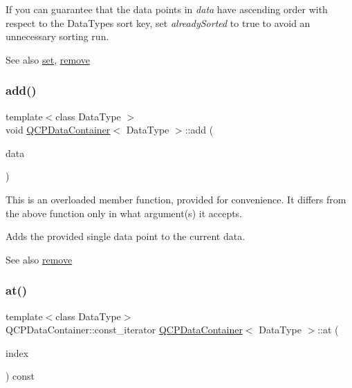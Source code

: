 If you can guarantee that the data points in {\itshape data} have ascending order with respect to the Data\+Type\textquotesingle{}s sort key, set {\itshape already\+Sorted} to true to avoid an unnecessary sorting run.

\begin{DoxySeeAlso}{See also}
\mbox{\hyperlink{class_q_c_p_data_container_ae7042bd534fc3ce7befa2ce3f790b5bf}{set}}, \mbox{\hyperlink{class_q_c_p_data_container_ae5f569a120648b167efa78835f12fd38}{remove}} 
\end{DoxySeeAlso}
\mbox{\label{class_q_c_p_data_container_a715e8e9972466804954a2f8fbd5288b7}} 
\subsubsection{\texorpdfstring{add()}{add()}\hspace{0.1cm}{\footnotesize\ttfamily [3/3]}}
{\footnotesize\ttfamily template$<$class Data\+Type $>$ \\
void \mbox{\hyperlink{class_q_c_p_data_container}{Q\+C\+P\+Data\+Container}}$<$ Data\+Type $>$\+::add (\begin{DoxyParamCaption}\item[{const Data\+Type \&}]{data }\end{DoxyParamCaption})}

This is an overloaded member function, provided for convenience. It differs from the above function only in what argument(s) it accepts.

Adds the provided single data point to the current data.

\begin{DoxySeeAlso}{See also}
\mbox{\hyperlink{class_q_c_p_data_container_ae5f569a120648b167efa78835f12fd38}{remove}} 
\end{DoxySeeAlso}
\mbox{\label{class_q_c_p_data_container_ae90c7457a052b223539906e6bddc0a92}} 
\subsubsection{\texorpdfstring{at()}{at()}}
{\footnotesize\ttfamily template$<$class Data\+Type$>$ \\
Q\+C\+P\+Data\+Container\+::const\+\_\+iterator \mbox{\hyperlink{class_q_c_p_data_container}{Q\+C\+P\+Data\+Container}}$<$ Data\+Type $>$\+::at (\begin{DoxyParamCaption}\item[{int}]{index }\end{DoxyParamCaption}) const\hspace{0.3cm}{\ttfamily [inline]}}

